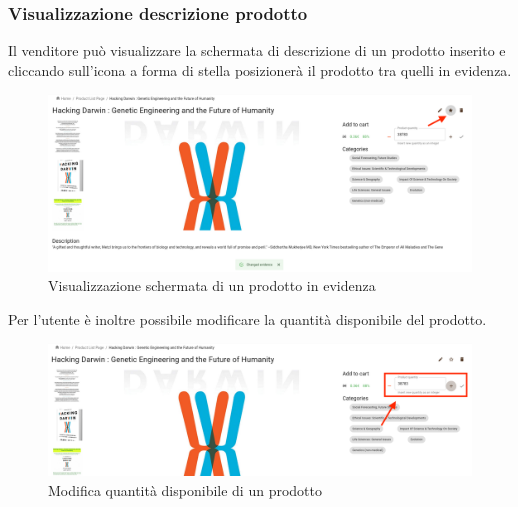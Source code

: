 \subsubsection{Visualizzazione descrizione prodotto}
Il venditore può visualizzare la schermata di descrizione di un prodotto inserito e cliccando sull'icona a forma di stella posizionerà il prodotto tra quelli in evidenza.
\begin{figure}[H]
	\centering
	\includegraphics[scale=0.25]{Immagini/Venditore/pdp-evidence-setted.seller.png}
	\caption{Visualizzazione schermata di un prodotto in evidenza}
	\label{fig:VisualizzazioneProdotto}
\end{figure}
Per l'utente è inoltre possibile modificare la quantità disponibile del prodotto.
\begin{figure}[H]
	\centering
	\includegraphics[scale=0.25]{Immagini/Venditore/pdp-changing-quantity.seller.png}
	\caption{Modifica quantità disponibile di un prodotto}
	\label{fig:QuantitàProdotto}
\end{figure}
